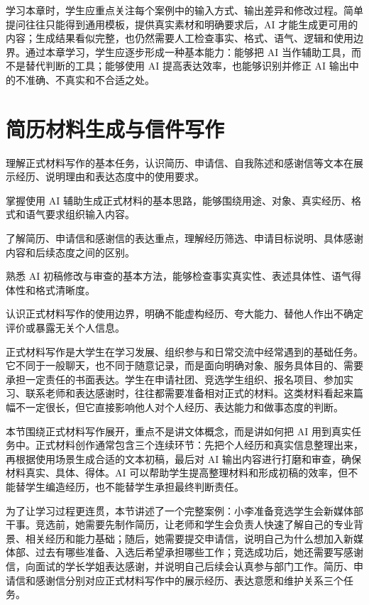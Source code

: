 学习本章时，学生应重点关注每个案例中的输入方式、输出差异和修改过程。简单提问往往只能得到通用模板，提供真实素材和明确要求后，AI 才能生成更可用的内容；生成结果看似完整，也仍然需要人工检查事实、格式、语气、逻辑和使用边界。通过本章学习，学生应逐步形成一种基本能力：能够把 AI 当作辅助工具，而不是替代判断的工具；能够使用 AI 提高表达效率，也能够识别并修正 AI 输出中的不准确、不真实和不合适之处。

\newpage

\section{简历材料生成与信件写作}

\begin{sectionkeypoints}
\item 理解正式材料写作的基本任务，认识简历、申请信、自我陈述和感谢信等文本在展示经历、说明理由和表达态度中的使用要求。
\item 掌握使用 AI 辅助生成正式材料的基本思路，能够围绕用途、对象、真实经历、格式和语气要求组织输入内容。
\item 了解简历、申请信和感谢信的表达重点，理解经历筛选、申请目标说明、具体感谢内容和后续态度之间的区别。
\item 熟悉 AI 初稿修改与审查的基本方法，能够检查事实真实性、表述具体性、语气得体性和格式清晰度。
\item 认识正式材料写作的使用边界，明确不能虚构经历、夸大能力、替他人作出不确定评价或暴露无关个人信息。
\end{sectionkeypoints}

正式材料写作是大学生在学习发展、组织参与和日常交流中经常遇到的基础任务。它不同于一般聊天，也不同于随意记录，而是面向明确对象、服务具体目的、需要承担一定责任的书面表达。学生在申请社团、竞选学生组织、报名项目、参加实习、联系老师和表达感谢时，往往都需要准备相对正式的材料。这类材料看起来篇幅不一定很长，但它直接影响他人对个人经历、表达能力和做事态度的判断。

本节围绕正式材料写作展开，重点不是讲文体概念，而是讲如何把 AI 用到真实任务中。正式材料创作通常包含三个连续环节：先把个人经历和真实信息整理出来，再根据使用场景生成合适的文本初稿，最后对 AI 输出内容进行打磨和审查，确保材料真实、具体、得体。AI 可以帮助学生提高整理材料和形成初稿的效率，但不能替学生编造经历，也不能替学生承担最终判断责任。

为了让学习过程更连贯，本节讲述了一个完整案例：小李准备竞选学生会新媒体部干事。竞选前，她需要先制作简历，让老师和学生会负责人快速了解自己的专业背景、相关经历和能力基础；随后，她需要提交申请信，说明自己为什么想加入新媒体部、过去有哪些准备、入选后希望承担哪些工作；竞选成功后，她还需要写感谢信，向面试的学长学姐表达感谢，并说明自己后续会认真参与部门工作。简历、申请信和感谢信分别对应正式材料写作中的展示经历、表达意愿和维护关系三个任务。

